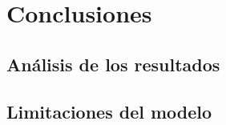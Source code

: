 \section{Conclusiones} 
\label{sec:4} %

\subsection{Análisis de los resultados}
\label{subsec:4_A}

\subsection{Limitaciones del modelo}
\label{subsec:4_B}
